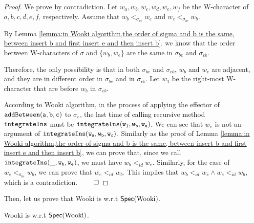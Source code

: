 \begin {proof}
We prove by contradiction. Let $w_a,w_b,w_c,w_d,w_e,w_f$ be the W-character of $a,b,c,d,e,f$, respectively. Assume that $w_b <_{\sigma_{eb}} w_e$ and $w_e <_{\sigma_{be}} w_b$.

By Lemma \ref{lemma:in Wooki algorithm,the order of sigma and b is the same, between insert b and first insert e and then insert b}, we know that the order between W-characters of $\sigma$ and $\{ w_b,w_e \}$ are the same in $\sigma_{be}$ and $\sigma_{eb}$.

Therefore, the only possibility is that in both $\sigma_{be}$ and $\sigma_{eb}$, $w_b$ and $w_e$ are adjacent, and they are in different order in $\sigma_{be}$ and in $\sigma_{eb}$. Let $w_1$ be the right-most W-character that are before $w_b$ in $\sigma_{eb}$.

According to Wooki algorithm, in the process of applying the effector of $\alabelshort[{\tt addBetween}]{a,b,c}$ to $\sigma_e$, the last time of calling recursive method ${\tt integrateIns}$ must be $\alabelshort[{\tt integrateIns}]{w_1,w_b,w_e}$. %
We can see that $w_e$ is not an argument of $\alabelshort[{\tt integrateIns}]{w_a,w_b,w_c}$. Similarly as the proof of Lemma \ref{lemma:in Wooki algorithm,the order of sigma and b is the same, between insert b and first insert e and then insert b}, we can prove that, since we call $\alabelshort[{\tt integrateIns}]{\_,w_b,w_e}$, we must have $w_b <_{id} w_e$. Similarly, for the case of $w_e <_{\sigma_{be}} w_b$, we can prove that $w_e <_{id} w_b$. This implies that $w_b <_{id} w_e \wedge w_e <_{id} w_b$, which is a contradiction. $\qed$
\end {proof}



Then, let us prove that Wooki is \crdtlinearizable{} w.r.t $\mathsf{Spec}(\text{Wooki})$.

\begin{lemma}
\label{lemma:Wooki is correct}
Wooki is \crdtlinearizable{} w.r.t $\mathsf{Spec}(\text{Wooki})$.
\end{lemma}

